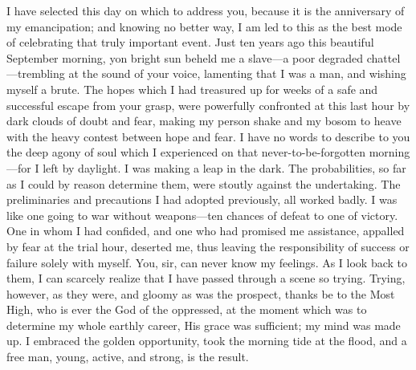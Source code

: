 I have selected this day on which to address you, because it is the
anniversary of my emancipation; and knowing no better way, I am led to
this as the best mode of celebrating that truly important event. Just
ten years ago this beautiful September morning, yon bright sun beheld me
a slave---a poor degraded chattel---trembling at the sound of your
voice, lamenting that I was a man, and wishing myself a brute. The hopes
which I had treasured up for weeks of a safe and successful escape from
your grasp, were powerfully confronted at this last hour by dark clouds
of doubt and fear, making my person shake and my bosom to heave with the
heavy contest between hope and fear. I have no words to describe to you
the deep agony of soul which I experienced on that never-to-be-forgotten
morning---for I left by daylight. I was making a leap in the dark. The
probabilities, so far as I could by reason determine them, were stoutly
against the undertaking. The preliminaries and precautions I had adopted
previously, all worked badly. I was like one going to war without
weapons---ten chances of defeat to one of victory. One in whom I had
confided, and one who had promised me assistance, appalled by fear at
the trial hour, deserted me, thus leaving the responsibility of success
or failure solely with myself. You, sir, can never know my feelings. As
I look back to them, I can scarcely realize that I have passed through a
scene so trying. Trying, however, as they were, and gloomy as was the
prospect, thanks be to the Most High, who is ever the God of the
oppressed, at the moment which was to determine my whole earthly career,
His grace was sufficient; my mind was made up. I embraced the golden
opportunity, took the morning tide at the flood, and a free man, young,
active, and strong, is the result.

